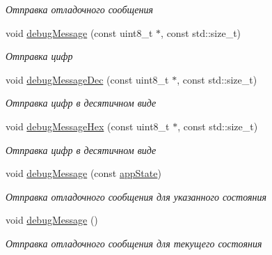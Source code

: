 \begin{DoxyCompactItemize}
\begin{DoxyCompactList}\small\item\em Отправка отладочного сообщения \end{DoxyCompactList}\item 
void \hyperlink{classapp_1_1_t_application_a9f4f8b1ef208edca2c5ea5ef1851efca}{debug\+Message} (const uint8\+\_\+t $\ast$, const std\+::size\+\_\+t)
\begin{DoxyCompactList}\small\item\em Отправка цифр \end{DoxyCompactList}\item 
\mbox{\label{classapp_1_1_t_application_a27c63bfb10aff853d0231c18df229c4c}} 
void \hyperlink{classapp_1_1_t_application_a27c63bfb10aff853d0231c18df229c4c}{debug\+Message\+Dec} (const uint8\+\_\+t $\ast$, const std\+::size\+\_\+t)
\begin{DoxyCompactList}\small\item\em Отправка цифр в десятичном виде \end{DoxyCompactList}\item 
\mbox{\label{classapp_1_1_t_application_a51545d51e9a81883df7791d8965da74f}} 
void \hyperlink{classapp_1_1_t_application_a51545d51e9a81883df7791d8965da74f}{debug\+Message\+Hex} (const uint8\+\_\+t $\ast$, const std\+::size\+\_\+t)
\begin{DoxyCompactList}\small\item\em Отправка цифр в десятичном виде \end{DoxyCompactList}\item 
void \hyperlink{classapp_1_1_t_application_ade46529292a73f5184abb54b135c4a2e}{debug\+Message} (const \hyperlink{group___xD0_x9F_xD0_xB5_xD1_x80_xD0_xB5_xD1_x87_xD0_xB8_xD1_x81_xD0_xBB_xD0_xB5_xD0_xBD_xD0_xB8_xD1_x8F_ga290e8080c661e52c2f685fd4af148acf}{app\+State})
\begin{DoxyCompactList}\small\item\em Отправка отладочного сообщения для указанного состояния \end{DoxyCompactList}\item 
\mbox{\label{classapp_1_1_t_application_a63da2a3bd444ed62efa0e35ae5f0571d}} 
void \hyperlink{classapp_1_1_t_application_a63da2a3bd444ed62efa0e35ae5f0571d}{debug\+Message} ()
\begin{DoxyCompactList}\small\item\em Отправка отладочного сообщения для текущего состояния \end{DoxyCompactList}\item 

\end{DoxyCompactItemize}
